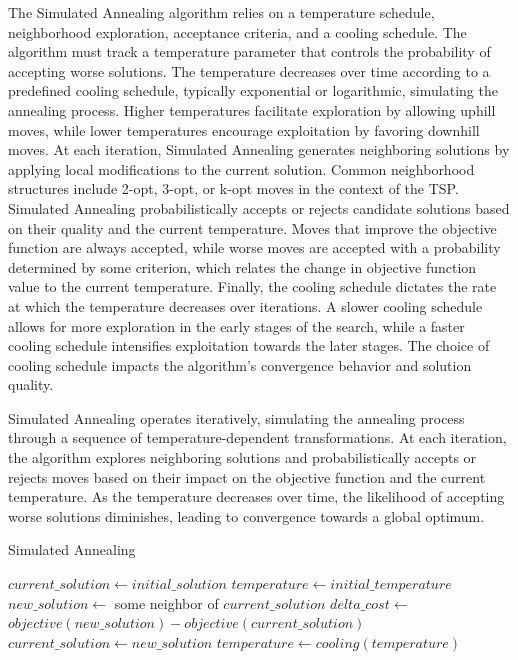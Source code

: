 \documentclass[11pt]{report}
\begin{document}
        The Simulated Annealing algorithm relies on a temperature schedule, neighborhood exploration, acceptance criteria, and a cooling schedule. The algorithm must track a temperature parameter that controls the probability of accepting worse solutions. The temperature decreases over time according to a predefined cooling schedule, typically exponential or logarithmic, simulating the annealing process. Higher temperatures facilitate exploration by allowing uphill moves, while lower temperatures encourage exploitation by favoring downhill moves. At each iteration, Simulated Annealing generates neighboring solutions by applying local modifications to the current solution. Common neighborhood structures include 2-opt, 3-opt, or k-opt moves in the context of the TSP. Simulated Annealing probabilistically accepts or rejects candidate solutions based on their quality and the current temperature. Moves that improve the objective function are always accepted, while worse moves are accepted with a probability determined by some criterion, which relates the change in objective function value to the current temperature. Finally, the cooling schedule dictates the rate at which the temperature decreases over iterations. A slower cooling schedule allows for more exploration in the early stages of the search, while a faster cooling schedule intensifies exploitation towards the later stages. The choice of cooling schedule impacts the algorithm's convergence behavior and solution quality.

        Simulated Annealing operates iteratively, simulating the annealing process through a sequence of temperature-dependent transformations. At each iteration, the algorithm explores neighboring solutions and probabilistically accepts or rejects moves based on their impact on the objective function and the current temperature. As the temperature decreases over time, the likelihood of accepting worse solutions diminishes, leading to convergence towards a global optimum.
        
        \begin{algorithm}[!h]
            \DontPrintSemicolon
            \caption{Simulated Annealing}
            \label{alg:anneal}
            \KwResult{}
        
            $current\_solution\gets initial\_solution$\;
            $temperature \gets initial\_temperature$\;
            {
                $new\_solution \gets$ some neighbor of $current\_solution$\;
                $delta\_cost \gets$ $objective(new\_solution) - objective(current\_solution)$\;
                {
                    $current\_solution\gets new\_solution$\;
                }
                $temperature\gets cooling(temperature)$\;
            }
        \end{algorithm}
        
\end{document}
